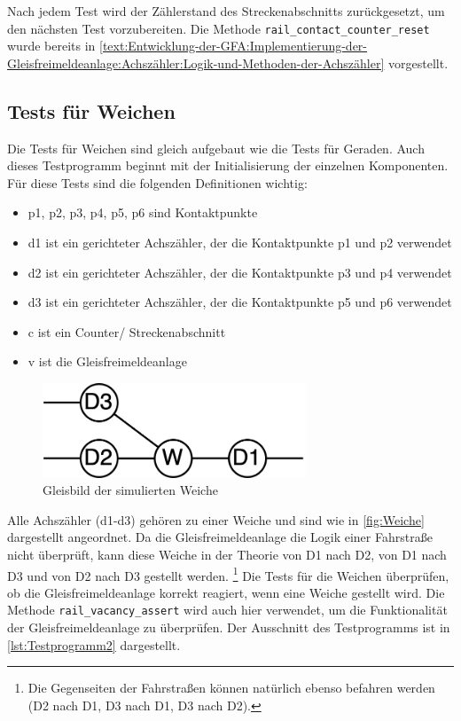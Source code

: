 Nach jedem Test wird der Zählerstand des Streckenabschnitts zurückgesetzt, um den nächsten Test vorzubereiten. Die Methode \texttt{rail\_contact\_counter\_reset} wurde bereits in \autoref{text:Entwicklung-der-GFA:Implementierung-der-Gleisfreimeldeanlage:Achszähler:Logik-und-Methoden-der-Achszähler}  vorgestellt.

\subsection{Tests für Weichen}\label{text:Entwicklung-der-GFA:Softwaretests:Tests-für-Weichen}

Die Tests für Weichen sind gleich aufgebaut wie die Tests für Geraden. Auch dieses Testprogramm beginnt mit der Initialisierung der einzelnen Komponenten. Für diese Tests sind die folgenden Definitionen wichtig:
\begin{itemize}
    \item p1, p2, p3, p4, p5, p6 sind Kontaktpunkte
    \item d1 ist ein gerichteter Achszähler, der die Kontaktpunkte p1 und p2 verwendet
    \item d2 ist ein gerichteter Achszähler, der die Kontaktpunkte p3 und p4 verwendet
    \item d3 ist ein gerichteter Achszähler, der die Kontaktpunkte p5 und p6 verwendet
    \item c ist ein Counter/ Streckenabschnitt
    \item v ist die Gleisfreimeldeanlage
\end{itemize}

\begin{figure}[H]
    \centering
    \includegraphics[width=0.7\textwidth]{Assets/Images/4-Entwicklung-der-GFA/Weiche.png}
    \caption{Gleisbild der simulierten Weiche}
    \label{fig:Weiche}
\end{figure}

Alle Achszähler (d1-d3) gehören zu einer Weiche und sind wie in \autoref{fig:Weiche} dargestellt angeordnet. Da die Gleisfreimeldeanlage die Logik einer Fahrstraße nicht überprüft, kann diese Weiche in der Theorie von D1 nach D2, von D1 nach D3 und von D2 nach D3 gestellt werden. \footnote{Die Gegenseiten der Fahrstraßen können natürlich ebenso befahren werden (D2 nach D1, D3 nach D1, D3 nach D2).} Die Tests für die Weichen überprüfen, ob die Gleisfreimeldeanlage korrekt reagiert, wenn eine Weiche gestellt wird. Die Methode \texttt{rail\_vacancy\_assert} wird auch hier verwendet, um die Funktionalität der Gleisfreimeldeanlage zu überprüfen. Der Ausschnitt des Testprogramms ist in \autoref{lst:Testprogramm2} dargestellt.

